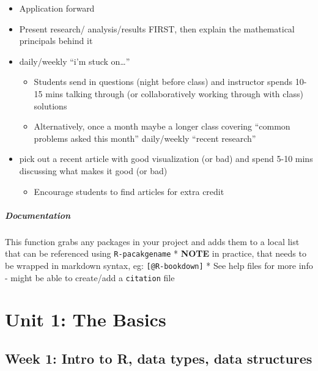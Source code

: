 \documentclass[
]{book}
\providecommand{\tightlist}{%
  \setlength{\itemsep}{0pt}\setlength{\parskip}{0pt}}
\begin{document}
\begin{itemize}
\tightlist
\item
  Application forward
\item
  Present research/ analysis/results FIRST, then explain the mathematical principals behind it
\item
  daily/weekly ``i'm stuck on\ldots{}''

  \begin{itemize}
  \tightlist
  \item
    Students send in questions (night before class) and instructor spends 10-15 mins talking through (or collaboratively working through with class) solutions
  \item
    Alternatively, once a month maybe a longer class covering ``common problems asked this month''
    daily/weekly ``recent research''
  \end{itemize}
\item
  pick out a recent article with good visualization (or bad) and spend 5-10 mins discussing what makes it good (or bad)

  \begin{itemize}
  \tightlist
  \item
    Encourage students to find articles for extra credit
  \end{itemize}
\end{itemize}

\hypertarget{documentation}{%
\paragraph{Documentation}\label{documentation}}

This function grabs any packages in your project and adds them to a local list that can be referenced using \texttt{R-pacakgename}
* \textbf{NOTE} in practice, that needs to be wrapped in markdown syntax, eg:
\texttt{{[}@R-bookdown{]}}
* See help files for more info - might be able to create/add a \texttt{citation} file

\hypertarget{unit1}{%
\chapter{Unit 1: The Basics}\label{unit1}}

\hypertarget{week-1-intro-to-r-data-types-data-structures-1}{%
\section{Week 1: Intro to R, data types, data structures}\label{week-1-intro-to-r-data-types-data-structures-1}}
\end{document}
